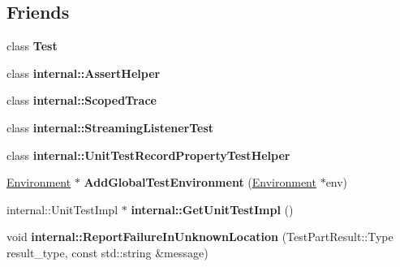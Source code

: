 \subsection*{Friends}
\begin{DoxyCompactItemize}
\item 
\hypertarget{classtesting_1_1_unit_test_ab085d1bf4cff8b1045750706b11f8662}{}class {\bfseries Test}\label{classtesting_1_1_unit_test_ab085d1bf4cff8b1045750706b11f8662}

\item 
\hypertarget{classtesting_1_1_unit_test_a7375bdc46f0244d0011c2d15ee160473}{}class {\bfseries internal\+::\+Assert\+Helper}\label{classtesting_1_1_unit_test_a7375bdc46f0244d0011c2d15ee160473}

\item 
\hypertarget{classtesting_1_1_unit_test_ac93c943076897e55055643c28d06415d}{}class {\bfseries internal\+::\+Scoped\+Trace}\label{classtesting_1_1_unit_test_ac93c943076897e55055643c28d06415d}

\item 
\hypertarget{classtesting_1_1_unit_test_a2021083660b7387a257fb6c6242fee73}{}class {\bfseries internal\+::\+Streaming\+Listener\+Test}\label{classtesting_1_1_unit_test_a2021083660b7387a257fb6c6242fee73}

\item 
\hypertarget{classtesting_1_1_unit_test_a4eaca072927111aedfecd9787cebbbcc}{}class {\bfseries internal\+::\+Unit\+Test\+Record\+Property\+Test\+Helper}\label{classtesting_1_1_unit_test_a4eaca072927111aedfecd9787cebbbcc}

\item 
\hypertarget{classtesting_1_1_unit_test_a5ec26e4c31220ff8e769cc09689a4d6d}{}\hyperlink{classtesting_1_1_environment}{Environment} $\ast$ {\bfseries Add\+Global\+Test\+Environment} (\hyperlink{classtesting_1_1_environment}{Environment} $\ast$env)\label{classtesting_1_1_unit_test_a5ec26e4c31220ff8e769cc09689a4d6d}

\item 
\hypertarget{classtesting_1_1_unit_test_a56e56be7066957d612e53b5c60f6ac08}{}internal\+::\+Unit\+Test\+Impl $\ast$ {\bfseries internal\+::\+Get\+Unit\+Test\+Impl} ()\label{classtesting_1_1_unit_test_a56e56be7066957d612e53b5c60f6ac08}

\item 
\hypertarget{classtesting_1_1_unit_test_a73f5a158c13793b90c80d854c9a75120}{}void {\bfseries internal\+::\+Report\+Failure\+In\+Unknown\+Location} (Test\+Part\+Result\+::\+Type result\+\_\+type, const std\+::string \&message)\label{classtesting_1_1_unit_test_a73f5a158c13793b90c80d854c9a75120}


\end{DoxyCompactItemize}
